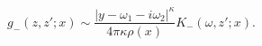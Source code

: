 \begin{equation}
g_-(z,z';x)\sim\frac{
|y-\omega_1-i\omega_2|^\kappa
}{4\pi\kappa\rho(x)}
K_-(\omega,z';x).\end{equation}

